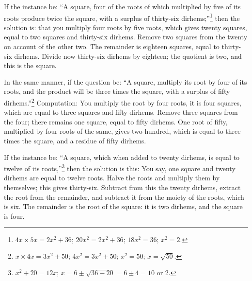 If the instance be: ``A square, four of the roots of which multiplied by five of its roots produce twice the square, with a surplus of thirty-six dirhems;''\footnote{$4x \times 5x = 2x^2 + 36$; $20x^2 = 2x^2 + 36$; $18x^2 = 36$; $x^2 = 2$.} then the solution is: that you multiply four roots by five roots, which gives twenty squares, equal to two squares and thirty-six dirhems. Remove two squares from the twenty on account of the other two. The remainder is eighteen squares, equal to thirty-six dirhems. Divide now thirty-six dirhems by eighteen; the quotient is two, and this is the square.

In the same manner, if the question be: ``A square, multiply its root by four of its roots, and the product will be three times the square, with a surplus of fifty dirhems.''\footnote{$x \times 4x = 3x^2 + 50$; $4x^2 = 3x^2 + 50$; $x^2 = 50$; $x = \sqrt{50}$.} Computation: You multiply the root by four roots, it is four squares, which are equal to three squares and fifty dirhems. Remove three squares from the four; there remains one square, equal to fifty dirhems. One root of fifty, multiplied by four roots of the same, gives two hundred, which is equal to three times the square, and a residue of fifty dirhems.

If the instance be: ``A square, which when added to twenty dirhems, is equal to twelve of its roots,''\footnote{$x^2 + 20 = 12x$; $x = 6 \pm \sqrt{36-20} = 6 \pm 4 = 10$ or $2$.} then the solution is this: You say, one square and twenty dirhems are equal to twelve roots. Halve the roots and multiply them by themselves; this gives thirty-six. Subtract from this the twenty dirhems, extract the root from the remainder, and subtract it from the moiety of the roots, which is six. The remainder is the root of the square: it is two dirhems, and the square is four.

